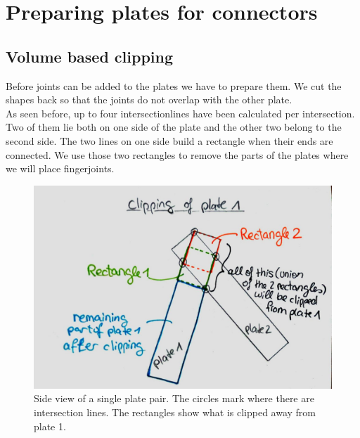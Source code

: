 \documentclass[../ClassicThesis.tex]{subfiles}
\begin{document}
\section{Preparing plates for connectors}
\subsection{Volume based clipping}
Before joints can be added to the plates we have to prepare them. We cut the shapes back so that the joints do not overlap with the other plate.\\
As seen before, up to four intersectionlines have been calculated per intersection. Two of them lie both on one side of the plate and the other two belong to the second side. The two lines on one side build a rectangle when their ends are connected. We use those two rectangles to remove the parts of the plates where we will place fingerjoints.
\begin{figure}[!ht]
\centering
\includegraphics[width=\columnwidth]{Images/10-joints-clippingPlate.jpg}
\caption{Side view of a single plate pair. The circles mark where there are intersection lines. The rectangles show what is clipped away from plate 1. }
\end{figure}
\end{document}
